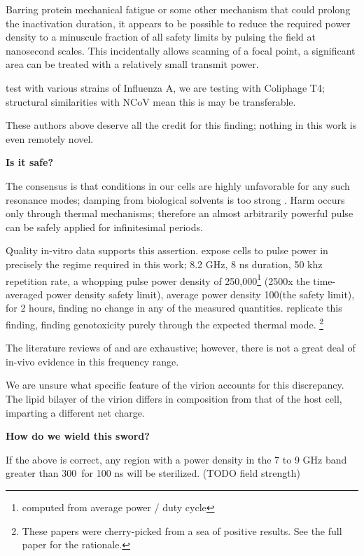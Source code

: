 \documentclass[fleqn,10pt]{paper}
\begin{document}
Barring protein mechanical fatigue \cite{Mechanical2013} or some other mechanism that could prolong the inactivation duration, it appears to be possible to reduce the required power density to a minuscule fraction of all safety limits by pulsing the field at nanosecond scales. This incidentally allows scanning of a focal point, a significant area can be treated with a relatively small transmit power.

\cite{Efficient2015} test with various strains of Influenza A, we are testing with Coliphage T4; structural similarities with NCoV mean this is may be transferable. 

These authors above deserve all the credit for this finding; nothing in this work is even remotely novel.

{\Large \textbf{Is it safe?}}

The consensus is that conditions in our cells are highly unfavorable for any such resonance modes; damping from biological solvents is too strong \cite{Vibrational2002}. Harm occurs only through thermal mechanisms; therefore an almost arbitrarily powerful pulse can be safely applied for infinitesimal periods.

Quality in-vitro data supports this assertion. \cite{Cytogenetic2006} expose cells to pulse power in precisely the regime required in this work; 8.2 GHz, 8 ns duration, 50 khz repetition rate, a whopping pulse power density of 250,000\Wsqm\footnote{computed from average power / duty cycle} (2500x the time-averaged power density safety limit), average power density 100\Wsqm (the safety limit), for 2 hours, finding no change in any of the measured quantities. \cite{DNA2004} replicate this finding, finding genotoxicity purely through the expected thermal mode. \footnote{These papers were cherry-picked from a sea of positive results. See the full paper for the rationale.}

The literature reviews of \cite{ICNIRP2020} and \cite{C95} are exhaustive; however, there is not a great deal of in-vivo evidence in this frequency range\cite{New2019}\cite{Comprehensive2018}.

We are unsure what specific feature of the virion accounts for this discrepancy. The lipid bilayer of the virion differs in composition from that of the host cell, imparting a different net charge.

\clearpage 
{\Large \textbf{How do we wield this sword?}}

If the above is correct, any region with a power density in the 7 to 9 GHz band greater than 300\Wsqm \ for 100 ns will be sterilized. (TODO field strength)
\end{document}
